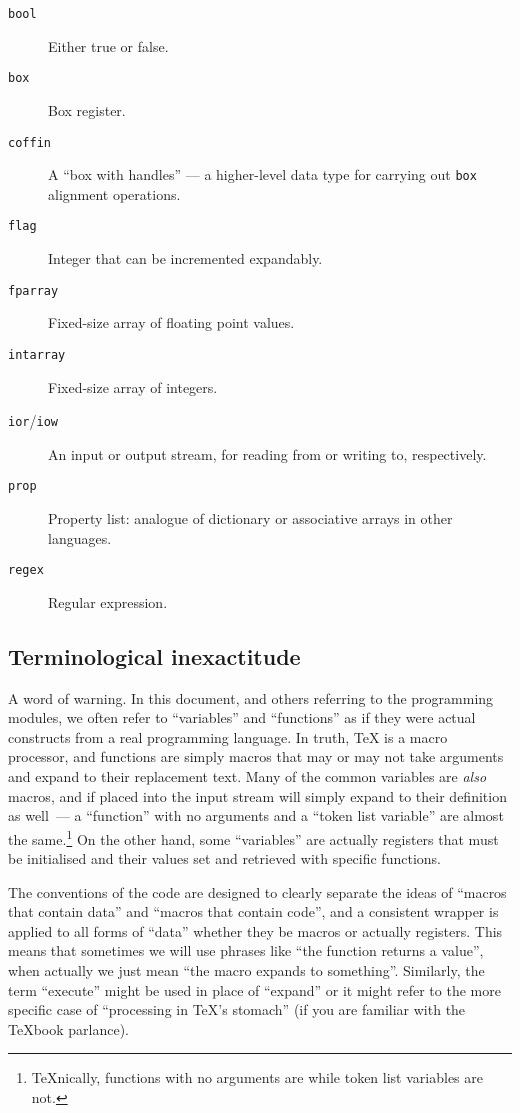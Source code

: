\documentclass[dvipdfmx,full,kernel]{wtpl3doc}
\begin{document}
\begin{description}
  \item[\texttt{bool}] Either true or false.
  \item[\texttt{box}] Box register.
  \item[\texttt{coffin}] A \enquote{box with handles} --- a higher-level
    data type for carrying out \texttt{box} alignment operations.
  \item[\texttt{flag}] Integer that can be incremented expandably.
  \item[\texttt{fparray}] Fixed-size array of floating point values.
  \item[\texttt{intarray}] Fixed-size array of integers.
  \item[\texttt{ior}/\texttt{iow}] An input or output stream, for
    reading from or writing to, respectively.
  \item[\texttt{prop}] Property list: analogue of dictionary or
    associative arrays in other languages.
  \item[\texttt{regex}] Regular expression.
\end{description}

\subsection{Terminological inexactitude}

A word of warning. In this document, and others referring to the 
programming modules, we often refer to \enquote{variables} and
\enquote{functions} as if they
were actual constructs from a real programming language.  In truth, \TeX{}
is a macro processor, and functions are simply macros that may or may not take
arguments and expand to their replacement text.  Many of the common variables
are \emph{also} macros, and if placed into the input stream will simply expand
to their definition as well~--- a \enquote{function} with no arguments and a
\enquote{token list variable} are almost the same.\footnote{\TeX{}nically,
functions with no arguments are  while token list variables are not.}
On the other
hand, some \enquote{variables} are actually registers that must be
initialised and their values set and retrieved with specific functions.

The conventions of the  code are designed to clearly separate the
ideas of \enquote{macros that contain data} and
\enquote{macros that contain code}, and a
consistent wrapper is applied to all forms of \enquote{data} whether they be
macros or
actually registers.  This means that sometimes we will use phrases like
\enquote{the function returns a value}, when actually we just mean
\enquote{the macro expands to something}. Similarly, the term
\enquote{execute} might be used in place of \enquote{expand}
or it might refer to the more specific case of
\enquote{processing in \TeX's stomach}
(if you are familiar with the \TeX{}book parlance).
\end{document}
